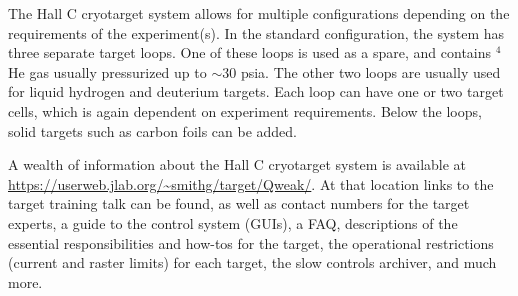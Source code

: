 

The Hall C cryotarget system allows for multiple configurations
depending on the requirements of the experiment(s). In the standard
configuration, the system has three separate target loops. One of
these loops is used as a spare, and contains $^{4}$He gas usually
pressurized up to $\sim$30 psia. The other two loops are usually used
for liquid hydrogen and deuterium targets.  Each loop can have one or
two target cells, which is again dependent on experiment requirements.
Below the loops, solid targets such as carbon foils can be added.

A wealth of information about the Hall C cryotarget system is
available at \url{https://userweb.jlab.org/\~smithg/target/Qweak/}.
At that location links to the target training talk can be found, as
well as contact numbers for the target experts, a guide to the control
system (GUIs), a FAQ, descriptions of the essential responsibilities
and how-tos for the target, the operational restrictions (current and
raster limits) for each target, the slow controls archiver, and much
more.
	

